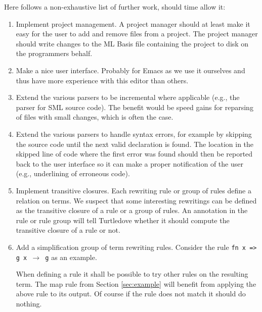 \documentclass[a4paper,oneside]{article}
\begin{document}
Here follows a non-exhaustive list of further work, should time allow it:

\begin{enumerate}

\item Implement project management. A project manager should at least make it easy for the user to
  add and remove files from a project. The project manager should write changes to the ML Basis
  file containing the project to disk on the programmers behalf.

\item Make a nice user interface. Probably for Emacs as we use it ourselves and thus have more
  experience with this editor than others.

\item Extend the various parsers to be incremental where applicable (e.g., the parser for SML source
  code). The benefit would be speed gains for reparsing of files with small changes, which is often
  the case.

\item Extend the various parsers to handle syntax errors, for example by skipping the source code
  until the next valid declaration is found. The location in the skipped line of code where the
  first error was found should then be reported back to the user interface so it can make a proper
  notification of the user (e.g., underlining of erroneous code).


\item Implement transitive closures. Each rewriting rule or group of rules define a relation on
  terms. We suspect that some interesting rewritings can be defined as the transitive closure of a
  rule or a group of rules. An annotation in the rule or rule group will tell Turtledove whether it
  should compute the transitive closure of a rule or not.

\item Add a simplification group of term rewriting rules. Consider the rule \texttt{fn x => g x
    $\rightarrow$ g} as an example.

  When defining a rule it shall be possible to try other rules on the resulting term. The map rule
  from Section \ref{sec:example} will benefit from applying the above rule to its output. Of course
  if the rule does not match it should do nothing.


\end{enumerate}
\end{document}

